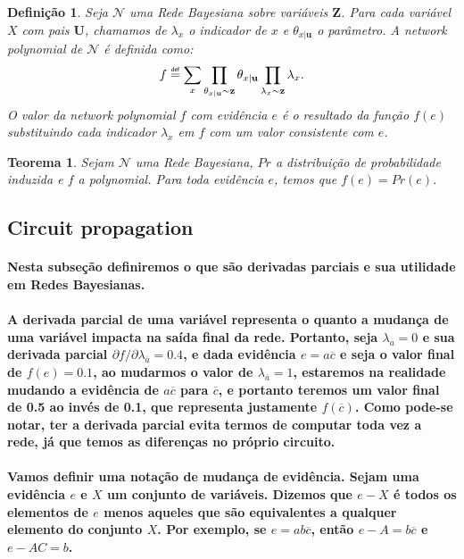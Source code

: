 \documentclass[a4paper,10pt]{article}
\newcommand\defeq{\mathrel{\overset{\makebox[0pt]{\mbox{\normalfont\tiny\sffamily def}}}{=}}}
\theoremstyle{plain}
\newtheorem*{spn-def}{Definição}
\newtheorem*{spn-thm}{Teorema}
\begin{document}
\begin{spn-def} Seja $\mathcal{N}$ uma Rede Bayesiana sobre variáveis $\mathbf{Z}$. Para cada 
variável $X$ com pais $\mathbf{U}$, chamamos de $\lambda_x$ o indicador de $x$ e 
$\theta_{x|\textbf{u}}$ o parâmetro. A \textit{network polynomial} de $\mathcal{N}$ é definida como:
\begin{equation}
f \defeq \sum_x \prod_{\theta_{x|\textbf{u}} \sim \textbf{z}} \theta_{x|\textbf{u}} \prod_{\lambda_x \sim \textbf{z}} \lambda_x.
\end{equation}
O valor da \textit{network polynomial} $f$ com evidência $e$ é o resultado da função $f(e)$ 
substituindo cada indicador $\lambda_x$ em $f$ com um valor consistente com $e$.
\end{spn-def}

\begin{spn-thm} Sejam $\mathcal{N}$ uma Rede Bayesiana, $Pr$ a distribuição de probabilidade
induzida e $f$ a \textit{polynomial}. Para toda evidência $e$, temos que $f(e)=Pr(e)$.
\end{spn-thm}

\subsection{Circuit propagation}

\paragraph{
  Nesta subseção definiremos o que são derivadas parciais e sua utilidade em Redes Bayesianas.
}

\paragraph{
  A derivada parcial de uma variável representa o quanto a mudança de uma variável impacta na saída
final da rede. Portanto, seja $\lambda_{\overline{a}}=0$ e sua derivada parcial
$\partial{f}/\partial{\lambda_{\overline{a}}} = 0.4$, e dada evidência $e=a\overline{c}$ e seja o
valor final de $f(e)=0.1$, ao mudarmos o valor de $\lambda_{\overline{a}}=1$, estaremos na realidade
mudando a evidência de $a\overline{c}$ para $\overline{c}$, e portanto teremos um valor final de
0.5 ao invés de 0.1, que representa justamente $f(\overline{c})$. Como pode-se notar, ter a 
derivada parcial evita termos de computar toda vez a rede, já que temos as diferenças no próprio
circuito.
}

\paragraph{
  Vamos definir uma notação de mudança de evidência. Sejam uma evidência $e$ e $X$ um conjunto
de variáveis. Dizemos que $e-X$ é todos os elementos de $e$ menos aqueles que são equivalentes a
qualquer elemento do conjunto $X$. Por exemplo, se $e=ab\overline{c}$, então $e-A=b\overline{c}$
e $e-AC=b$.
}
\end{document}
